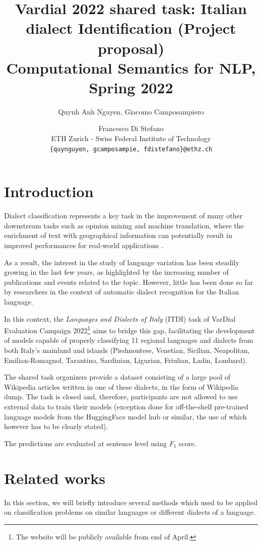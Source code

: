\documentclass[11pt]{article}
\title{
Vardial 2022 shared task: Italian dialect Identification (Project proposal)\\
\vspace{0.2cm}
\small Computational Semantics for NLP, Spring 2022
}
\author{
Quynh Anh Nguyen,
Giacomo Camposampiero 
\and Francesco Di Stefano \\         
ETH Zurich - Swiss Federal Institute of Technology \\ \texttt{\{quynguyen, gcamposampie, fdistefano\}@ethz.ch}
}
\begin{document}
\maketitle

\section{Introduction}\label{sec:intro}
Dialect classification represents a key task in the improvement of many other downstream tasks such as opinion mining and machine translation, where the enrichment of text with geographical information can potentially result in improved performances for real-world applications \cite{zampieri_nakov_scherrer_2020}.

As a result, the interest in the study of language variation has been steadily growing in the last few years, as highlighted by the increasing number of publications and events related to the topic.
However, little has been done so far by researchers in the context of automatic dialect recognition for the Italian language.

In this context, the \textit{Languages and Dialects of Italy} (ITDI) task of VarDial Evaluation Campaign 2022\footnote{The website will be publicly available from end of April.} aims to bridge this gap, facilitating the development of models capable of properly classifying 11 regional languages and dialects from both Italy's mainland and islands (Piedmontese, Venetian, Sicilian, Neapolitan, Emilian-Romagnol, Tarantino, Sardinian, Ligurian, Friulian, Ladin, Lombard).

The shared task organizers provide a dataset consisting of a large pool of Wikipedia articles written in one of these dialects, in the form of Wikipedia dump.
The task is closed and, therefore, participants are not allowed to use external data to train their models (exception done for off-the-shelf pre-trained language models from the HuggingFace model hub or similar, the use of which however has to be clearly stated). 

The predictions are evaluated at sentence level using $F_1$ score. %

\section{Related works}
In this section, we will briefly introduce several methods \cite{zampieri_nakov_scherrer_2020} which used to be applied on classification problems on similar languages or different dialects of a language.
\end{document}
